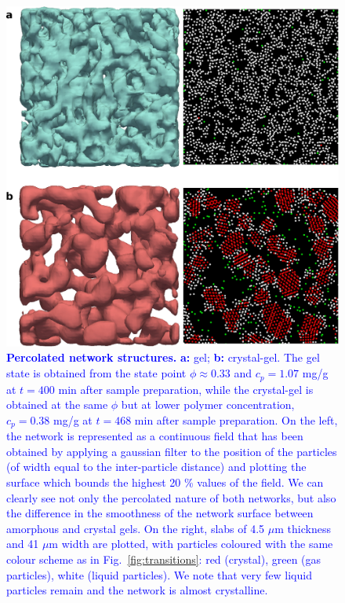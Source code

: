 \documentclass[preprint,amsmath,amssymb,superscriptaddress]{revtex4-1}
\begin{document}
\clearpage

\begin{figure}[!t]
 \centering
 \includegraphics[width=12cm]{fig2}
\caption{\textcolor{blue}{{\bf Percolated network structures.} {\bf a:} gel; {\bf b:} crystal-gel. The gel state is obtained from the state
point $\phi\approx 0.33$ and $c_p=1.07$ mg/g at $t=400$ min after sample preparation, while the crystal-gel is obtained at the same $\phi$ but
at lower polymer concentration, $c_p=0.38$ mg/g at $t=468$ min after sample preparation. On the left, the network is represented as a continuous field that has
been obtained by applying a gaussian filter to the position of the particles (of width equal to the inter-particle distance) and
plotting the surface which bounds the highest 20 \% values of the field. We can clearly see not only the percolated nature of both networks, 
but also the difference in the smoothness of the network surface between amorphous and crystal gels. 
On the right, slabs of 4.5 $\mu$m thickness and 41 $\mu$m width are plotted,
with particles coloured with the same colour scheme as in Fig.~\ref{fig:transitions}: red (crystal), green (gas particles), white (liquid particles). 
We note that very few liquid particles remain and the network is almost crystalline. 
}} 
\label{fig:network}
\end{figure}

\clearpage
\end{document}
